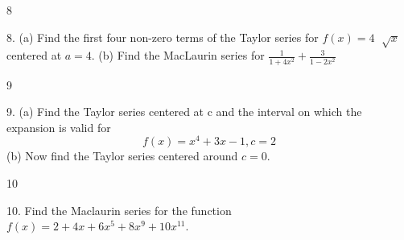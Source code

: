 \documentclass{article}
\begin{document}
\newpage
\begin{flushleft}
8
\end{flushleft}
8. (a) Find the first four non-zero terms of the Taylor series for $f(x) = 4$ $\sqrt[]{x}$ centered at $a = 4$.
\vfill
(b) Find the MacLaurin series for $\displaystyle\frac{1}{1 + 4x^2} + \frac{3}{1-2x^2}$
\vfill

\newpage
\begin{flushright}
9
\end{flushright}
9. (a) Find the Taylor series centered at c and the interval
on which the expansion is valid for $$f(x) = x^4 + 3x - 1, c=2$$
\vfill
(b) Now find the Taylor series centered around $c=0$.
\vfill

\newpage
\begin{flushleft}
10
\end{flushleft}
10. Find the Maclaurin series for the function $f(x) = 2 + 4x + 6x^5 + 8x^9 + 10x^{11}$.
\end{document}
